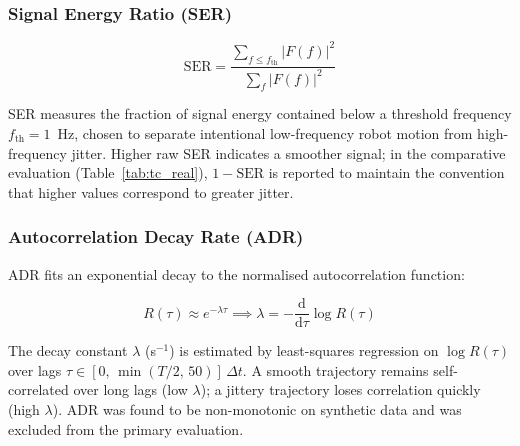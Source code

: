 \subsubsection{Signal Energy Ratio (SER)}

\begin{equation}
    \text{SER} = \frac{\sum_{f \leq f_{\text{th}}} |F(f)|^2}{\sum_{f} |F(f)|^2}
    \label{eq:ser}
\end{equation}

SER measures the fraction of signal energy contained below a threshold
frequency $f_{\text{th}} = 1$~Hz, chosen to separate intentional low-frequency
robot motion from high-frequency jitter. Higher raw SER indicates a smoother
signal; in the comparative evaluation (Table~\ref{tab:tc_real}), $1-\text{SER}$
is reported to maintain the convention that higher values correspond to greater
jitter.

\subsubsection{Autocorrelation Decay Rate (ADR)}

ADR fits an exponential decay to the normalised autocorrelation function:

\begin{equation}
    R(\tau) \approx e^{-\lambda\tau}
    \implies
    \lambda = -\frac{\mathrm{d}}{\mathrm{d}\tau}\log R(\tau)
    \label{eq:adr}
\end{equation}

The decay constant $\lambda$ (s$^{-1}$) is estimated by least-squares regression
on $\log R(\tau)$ over lags $\tau \in [0,\, \min(T/2,\, 50)]\,\Delta t$. A
smooth trajectory remains self-correlated over long lags (low $\lambda$); a
jittery trajectory loses correlation quickly (high $\lambda$). ADR was found to
be non-monotonic on synthetic data and was excluded from the primary evaluation.

%
%
